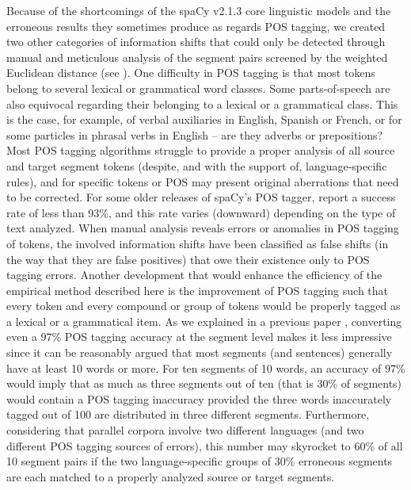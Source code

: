 \documentclass[output=paper]{langsci/langscibook}
\begin{document}
Because of the shortcomings of the spaCy v2.1.3 core linguistic models and the erroneous results they sometimes produce as regards POS tagging, we created two other categories of information shifts that could only be detected through manual and meticulous analysis of the segment pairs screened by the weighted Euclidean distance (see ). One difficulty in POS tagging is that most tokens belong to several lexical or grammatical word classes. Some parts-of-speech are also equivocal regarding their belonging to a lexical or a grammatical class. This is the case, for example, of verbal auxiliaries in English, Spanish or French, or for some particles in phrasal verbs in English -- are they adverbs or prepositions? Most POS tagging algorithms struggle to provide a proper analysis of all source and target segment tokens (despite, and with the support of, language-specific rules), and for specific tokens or POS may present original aberrations that need to be corrected. For some older releases of spaCy's POS tagger, \textcite{gieeve09} report a success rate of less than 93\%, and this rate varies (downward) depending on the type of text analyzed. When manual analysis reveals errors or anomalies in POS tagging of tokens, the involved information shifts have been classified as false shifts (in the way that they are false positives) that owe their existence only to POS tagging errors. Another development that would enhance the efficiency of the empirical method described here is the improvement of POS tagging such that every token and every compound or group of tokens would be properly tagged as a lexical or a grammatical item. As we explained in a previous paper \parencite[8]{poirier17}, converting even a 97\% POS tagging accuracy at the segment level makes it less impressive since it can be reasonably argued that most segments (and sentences) generally have at least 10 words or more. For ten segments of 10 words, an accuracy of 97\% would imply that as much as three segments out of ten (that is 30\% of segments) would contain a POS tagging inaccuracy provided the three words inaccurately tagged out of 100 are distributed in three different segments. Furthermore, considering that parallel corpora involve two different languages (and two different POS tagging sources of errors), this number may skyrocket to 60\% of all 10 segment pairs if the two language-specific groups of 30\% erroneous segments are each matched to a properly analyzed source or target segments.
\end{document}
